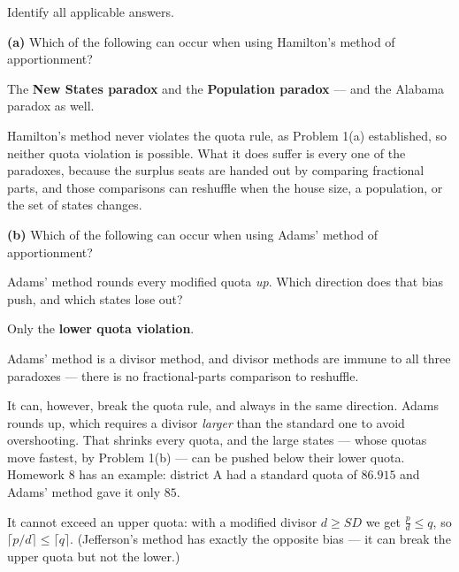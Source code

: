 \documentclass[12pt]{ximera}
\begin{document}
\begin{problem}
Identify all applicable answers.

\begin{prompt}
\textbf{(a)} Which of the following can occur when using Hamilton's method of
apportionment?

\begin{selectAll}
\end{selectAll}

\begin{feedback}
The \textbf{New States paradox} and the \textbf{Population paradox} --- and the Alabama
paradox as well.

Hamilton's method never violates the quota rule, as Problem 1(a) established, so neither
quota violation is possible. What it does suffer is every one of the paradoxes, because
the surplus seats are handed out by comparing fractional parts, and those comparisons can
reshuffle when the house size, a population, or the set of states changes.
\end{feedback}
\end{prompt}

\begin{prompt}
\textbf{(b)} Which of the following can occur when using Adams' method of
apportionment?

\begin{selectAll}
\end{selectAll}

\begin{hint}
Adams' method rounds every modified quota \emph{up}. Which direction does that bias
push, and which states lose out?
\end{hint}

\begin{feedback}
Only the \textbf{lower quota violation}.

Adams' method is a divisor method, and divisor methods are immune to all three
paradoxes --- there is no fractional-parts comparison to reshuffle.

It can, however, break the quota rule, and always in the same direction. Adams rounds
up, which requires a divisor \emph{larger} than the standard one to avoid overshooting.
That shrinks every quota, and the large states --- whose quotas move fastest, by Problem
1(b) --- can be pushed below their lower quota. Homework 8 has an example: district A had
a standard quota of $86.915$ and Adams' method gave it only $85$.

It cannot exceed an upper quota: with a modified divisor $d \ge SD$ we get
$\frac{p}{d} \le q$, so $\lceil p/d\rceil \le \lceil q\rceil$. (Jefferson's method has
exactly the opposite bias --- it can break the upper quota but not the lower.)
\end{feedback}
\end{prompt}
\end{problem}
\end{document}
